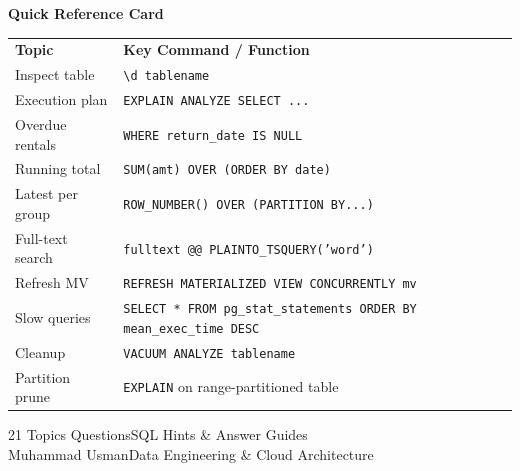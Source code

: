 \documentclass[11pt,a4paper]{article}
\begin{document}
\vspace*{2cm}
\begin{center}
{\large\bfseries\color{AccentGold} Quick Reference Card}\\[1.5em]

\begin{tcolorbox}[
  width=0.9\linewidth,
  colback=PgBlue!25!PgDark,
  colframe=PgBlue!60,
  arc=8pt, boxrule=0.8pt
]
\color{PgLight}\small
\begin{tabularx}{\linewidth}{@{} l X @{}}
\textcolor{AccentGold}{\textbf{Topic}} & \textcolor{AccentGold}{\textbf{Key Command / Function}} \\[4pt]
Inspect table   & \texttt{\textbackslash d tablename} \\
Execution plan  & \texttt{EXPLAIN ANALYZE SELECT ...} \\
Overdue rentals & \texttt{WHERE return\_date IS NULL} \\
Running total   & \texttt{SUM(amt) OVER (ORDER BY date)} \\
Latest per group & \texttt{ROW\_NUMBER() OVER (PARTITION BY...)} \\
Full-text search & \texttt{fulltext @@ PLAINTO\_TSQUERY('word')} \\
Refresh MV      & \texttt{REFRESH MATERIALIZED VIEW CONCURRENTLY mv} \\
Slow queries    & \texttt{SELECT * FROM pg\_stat\_statements ORDER BY mean\_exec\_time DESC} \\
Cleanup         & \texttt{VACUUM ANALYZE tablename} \\
Partition prune & \texttt{EXPLAIN} on range-partitioned table \\
\end{tabularx}
\end{tcolorbox}

\vspace{2em}
{\color{MidGray}\small 21 Topics\enspace\textbullet{} Questions\enspace\textbullet\enspace SQL Hints \& Answer Guides}\\[0.5em]
{\color{MidGray}\small Muhammad Usman\enspace\textbullet\enspace Data Engineering \& Cloud Architecture}
\end{center}
\nopagecolor
\end{document}
